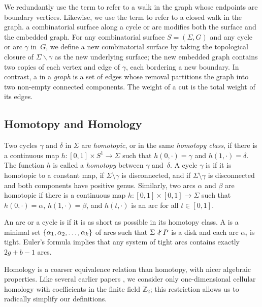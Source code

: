 \documentclass[twoside,leqno,twocolumn]{article}
\def\Z{\mathbb{Z}}
\def\snip{\mathbin{\raisebox{0.15ex}{\rotatebox[origin=c]{60}{\Rightscissors}\!}}}
\begin{document}
We redundantly use the term  to refer to a walk in the graph whose endpoints are boundary vertices.  Likewise, we use the term  to refer to a closed walk in the graph.   a combinatorial surface along a cycle or  arc modifies both the surface and the embedded graph.  For any combinatorial surface $S = (\Sigma, G)$ and any cycle or arc $\gamma$ in~$G$, we define a new combinatorial surface \EMPH{$S \snip \gamma$} by taking the topological closure of $\Sigma \backslash \gamma$ as the new underlying surface; the new embedded graph contains two copies of each vertex and edge of $\gamma$, each bordering a new boundary.  In contrast, a  in a \emph{graph} is a set of edges whose removal partitions the graph into two non-empty connected components.  The weight of a cut is the total weight of its edges.

\subsection{Homotopy and Homology}

Two cycles $\gamma$ and $\delta$ in $\Sigma$ are \emph{homotopic}, or in the same \emph{homotopy class}, if there is a continuous map $h\colon {[0,1]\times S^1 \to \Sigma}$ such that $h(0,\cdot) = \gamma$ and $h(1,\cdot) = \delta$.  The function $h$ is called a \emph{homotopy} between $\gamma$ and~$\delta$.  A cycle $\gamma$ is  if it is homotopic to a constant map,  if $\Sigma\setminus\gamma$ is disconnected, and  if $\Sigma\setminus\gamma$ is disconnected and both components have positive genus.
Similarly, two arcs $\alpha$ and $\beta$ are homotopic if there is a continuous  map $h\colon {[0,1]\times[0,1] \to \Sigma}$ such that ${h(0,\cdot) = \alpha}$, $h(1,\cdot) = \beta$, and $h(t,\cdot)$ is an arc for all $t\in [0,1]$.  

An arc or a cycle is  if it is as short as possible in its homotopy class.  A  is a minimal set $\{ \alpha_1, \alpha_2, \dots, \alpha_k \}$ of arcs such that $\Sigma \snip P$ is a disk and each arc $\alpha_i$ is tight.  Euler’s formula implies that any system of tight arcs contains exactly $2g+b-1$ arcs.


Homology is a coarser equivalence relation than homotopy, with nicer algebraic properties. Like several earlier papers \cite{cf-qhc2-07, cf-qhc-08, dls-chtl-07, dlsc-cgaht-08, cen-mcshc-09, en-mcsnc-11}, we consider only one-dimensional cellular homology with coefficients in the finite field $\Z_2$; this restriction allows us to radically simplify our definitions.
\end{document}
